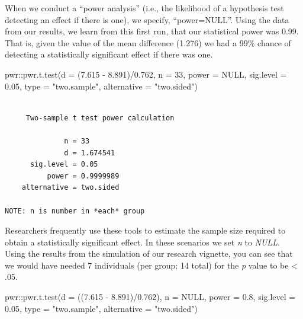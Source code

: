 \documentclass[
  11pt,
]{book}
\newenvironment{Shaded}{\begin{snugshade}}{\end{snugshade}}
\newcommand{\AttributeTok}[1]{\textcolor[rgb]{0.77,0.63,0.00}{#1}}
\newcommand{\ConstantTok}[1]{\textcolor[rgb]{0.00,0.00,0.00}{#1}}
\newcommand{\DecValTok}[1]{\textcolor[rgb]{0.00,0.00,0.81}{#1}}
\newcommand{\FloatTok}[1]{\textcolor[rgb]{0.00,0.00,0.81}{#1}}
\newcommand{\FunctionTok}[1]{\textcolor[rgb]{0.00,0.00,0.00}{#1}}
\newcommand{\NormalTok}[1]{#1}
\newcommand{\SpecialCharTok}[1]{\textcolor[rgb]{0.00,0.00,0.00}{#1}}
\newcommand{\StringTok}[1]{\textcolor[rgb]{0.31,0.60,0.02}{#1}}
\begin{document}
When we conduct a ``power analysis'' (i.e., the likelihood of a hypothesis test detecting an effect if there is one), we specify, ``power=NULL''. Using the data from our results, we learn from this first run, that our statistical power was 0.99. That is, given the value of the mean difference (1.276) we had a 99\% chance of detecting a statistically significant effect if there was one.

\begin{Shaded}
\begin{Highlighting}[]
\NormalTok{pwr}\SpecialCharTok{::}\FunctionTok{pwr.t.test}\NormalTok{(}\AttributeTok{d =}\NormalTok{ (}\FloatTok{7.615} \SpecialCharTok{{-}} \FloatTok{8.891}\NormalTok{)}\SpecialCharTok{/}\FloatTok{0.762}\NormalTok{, }\AttributeTok{n =} \DecValTok{33}\NormalTok{, }\AttributeTok{power =} \ConstantTok{NULL}\NormalTok{, }\AttributeTok{sig.level =} \FloatTok{0.05}\NormalTok{,}
    \AttributeTok{type =} \StringTok{"two.sample"}\NormalTok{, }\AttributeTok{alternative =} \StringTok{"two.sided"}\NormalTok{)}
\end{Highlighting}
\end{Shaded}

\begin{verbatim}

     Two-sample t test power calculation 

              n = 33
              d = 1.674541
      sig.level = 0.05
          power = 0.9999989
    alternative = two.sided

NOTE: n is number in *each* group
\end{verbatim}

Researchers frequently use these tools to estimate the sample size required to obtain a statistically significant effect. In these scenarios we set \emph{n} to \emph{NULL}. Using the results from the simulation of our research vignette, you can see that we would have needed 7 individuals (per group; 14 total) for the \emph{p} value to be \textless{} .05.

\begin{Shaded}
\begin{Highlighting}[]
\NormalTok{pwr}\SpecialCharTok{::}\FunctionTok{pwr.t.test}\NormalTok{(}\AttributeTok{d =}\NormalTok{ ((}\FloatTok{7.615} \SpecialCharTok{{-}} \FloatTok{8.891}\NormalTok{)}\SpecialCharTok{/}\FloatTok{0.762}\NormalTok{), }\AttributeTok{n =} \ConstantTok{NULL}\NormalTok{, }\AttributeTok{power =} \FloatTok{0.8}\NormalTok{, }\AttributeTok{sig.level =} \FloatTok{0.05}\NormalTok{,}
    \AttributeTok{type =} \StringTok{"two.sample"}\NormalTok{, }\AttributeTok{alternative =} \StringTok{"two.sided"}\NormalTok{)}
\end{Highlighting}
\end{Shaded}
\end{document}
